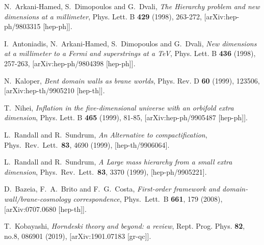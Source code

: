 \documentclass[aps,12pt, a4paper,nofootinbib]{revtex4}
\begin{document}
{\begin{thebibliography}{99}
N.~Arkani-Hamed, S.~Dimopoulos and G.~Dvali,
{\it The Hierarchy problem and new dimensions at a millimeter},
Phys. Lett. B \textbf{429} (1998), 263-272,
[arXiv:hep-ph/9803315 [hep-ph]].

I.~Antoniadis, N.~Arkani-Hamed, S.~Dimopoulos and G.~Dvali,
{\it New dimensions at a millimeter to a Fermi and superstrings at a TeV},
Phys. Lett. B \textbf{436} (1998), 257-263,
[arXiv:hep-ph/9804398 [hep-ph]].

N.~Kaloper,
{\it Bent domain walls as brane worlds},
Phys. Rev. D \textbf{60} (1999), 123506,
[arXiv:hep-th/9905210 [hep-th]].

T.~Nihei,
{\it Inflation in the five-dimensional universe with an orbifold extra dimension},
Phys. Lett. B \textbf{465} (1999), 81-85,
[arXiv:hep-ph/9905487 [hep-ph]].

  L.~Randall and R.~Sundrum,
  {\it An Alternative to compactification},
  Phys.\ Rev.\ Lett.\  {\bf 83}, 4690 (1999),
  [hep-th/9906064].
	
  L.~Randall and R.~Sundrum,
  {\it A Large mass hierarchy from a small extra dimension},
  Phys.\ Rev.\ Lett.\  {\bf 83}, 3370 (1999),
  [hep-ph/9905221].
	
  D.~Bazeia, F.~A.~Brito and F.~G.~Costa,
  {\it First-order framework and domain-wall/brane-cosmology correspondence},
  Phys.\ Lett.\ B {\bf 661}, 179 (2008),
  [arXiv:0707.0680 [hep-th]].


T.~Kobayashi,
{\it Horndeski theory and beyond: a review},
Rept. Prog. Phys. \textbf{82}, no.8, 086901 (2019),
[arXiv:1901.07183 [gr-qc]].


\end{thebibliography}}
\end{document}
